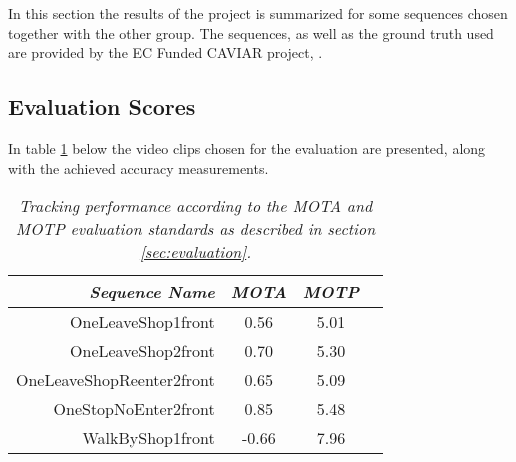 In this section the results of the project is summarized for some sequences chosen together with the other group. The sequences, as well as the ground truth used are provided by the EC Funded CAVIAR project, \cite{CAVIAR}.

\subsection{Evaluation Scores}
In table \ref{tab:evaluation_performance} below the video clips chosen for the evaluation are presented, along with the achieved accuracy measurements.

\begin{table}[h]
\centering
	\begin{tabular}{r | c | c | c }
		\emph{Sequence Name}		& \emph{MOTA} & \emph{MOTP} \\
		\hline \hline
		OneLeaveShop1front			& 0.56 & 5.01 \\
		OneLeaveShop2front			& 0.70 & 5.30 \\
		OneLeaveShopReenter2front	& 0.65 & 5.09 \\
		OneStopNoEnter2front 		& 0.85 & 5.48 \\
		WalkByShop1front 			& -0.66 & 7.96 \\
	\end{tabular}
	\caption{\textit{Tracking performance according to the MOTA and MOTP evaluation standards as described in section \ref{sec:evaluation}.}}
	\label{tab:evaluation_performance}
\end{table}

